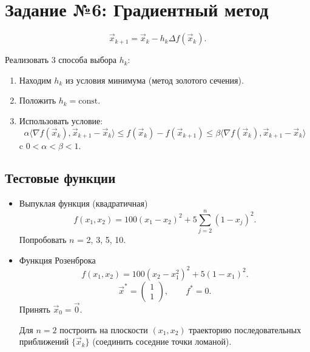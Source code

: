 \documentclass{article}
\begin{document}
\section*{Задание №6: Градиентный метод}

\begin{equation*}
    \vec{x}_{k+1} =
        \vec{x}_k
        - h_k \Delta f (\vec{x}_k).
\end{equation*}

Реализовать 3 способа выбора $h_k$:
\begin{enumerate}
    \item Находим $h_k$ из условия минимума (метод золотого сечения).
    \item Положить $h_k = \text{const}$.
    \item Использовать условие:
    \begin{equation*}
        \alpha \langle \nabla f(\vec{x}_k), \vec{x}_{k+1} - \vec{x}_k \rangle
        \leqslant f(\vec{x}_k) - f(\vec{x}_{k+1})
        \leqslant \beta \langle \nabla f(\vec{x}_k), \vec{x}_{k+1} - \vec{x}_k \rangle
    \end{equation*}
    c $0 < \alpha < \beta < 1$.
\end{enumerate}


\subsection*{Тестовые функции}

\begin{itemize}
    \item{}
        Выпуклая функция (квадратичная)
        \begin{equation*}
            f(x_1, x_2) = 100 \left(x_1 - x_2\right)^2
                          + 5 \sum_{j=2}^{n}\left(1 - x_j\right)^2.
        \end{equation*}
        Попробовать $n$ = 2, 3, 5, 10.
    \item{}
        Функция Розенброка
        \begin{equation*}
            f(x_1, x_2) = 100 \left(x_2 - x_1^2\right)^2
                          + 5\left(1 - x_1\right)^2.
        \end{equation*}
        \begin{equation*}
            \vec{x}^* =
            \begin{pmatrix}1\\1\end{pmatrix}, \qquad f^* = 0.
        \end{equation*}
        Принять $\vec{x}_0 = \vec{0}$.

        Для $n = 2$ построить на плоскости $(x_1, x_2)$ траекторию
        последовательных приближений $\{\vec{x}_k\}$ (соединить соседние
        точки ломаной).
\end{itemize}
\end{document}
